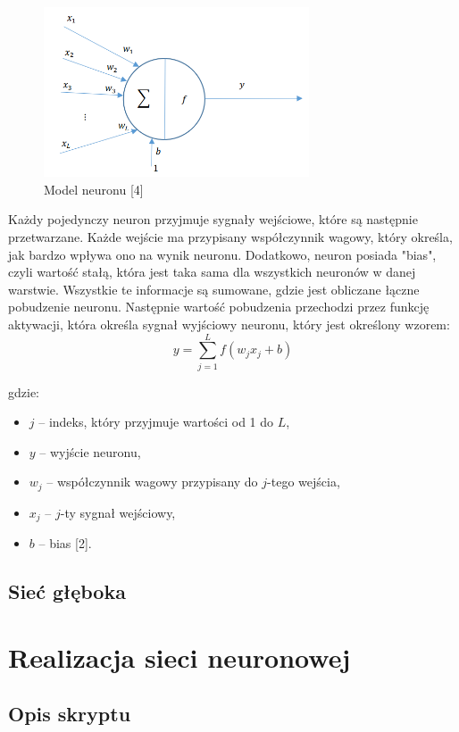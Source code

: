 \documentclass{article}
\begin{document}
\begin{figure}[h]
    \centering
    \includegraphics[width=0.7\textwidth]{model_neuronu.png}
    \caption{Model neuronu [4]}
    \label{fig:zdjecie}
\end{figure}
Każdy pojedynczy neuron przyjmuje sygnały wejściowe, które są następnie przetwarzane.
Każde wejście ma przypisany współczynnik wagowy, który określa, jak bardzo wpływa ono na wynik neuronu.
Dodatkowo, neuron posiada "bias", czyli wartość stałą, która jest taka sama dla wszystkich neuronów w danej warstwie.
Wszystkie te informacje są sumowane, gdzie jest obliczane łączne pobudzenie neuronu.
Następnie wartość pobudzenia przechodzi przez funkcję aktywacji, która określa sygnał wyjściowy neuronu, który jest określony wzorem:
\[
    y = \sum_{j=1}^{L} f(w_{j} x_{j} + b)
\]

gdzie:
\begin{itemize}
    \item $j$ -- indeks, który przyjmuje wartości od 1 do $L$,
    \item $y$ -- wyjście neuronu,
    \item $w_{j}$ -- współczynnik wagowy przypisany do $j$-tego wejścia,
    \item $x_{j}$ -- $j$-ty sygnał wejściowy,
    \item $b$ -- bias [2].
\end{itemize}

\subsection{Sieć głęboka}
\section{Realizacja sieci neuronowej}
\subsection{Opis skryptu}
\end{document}
